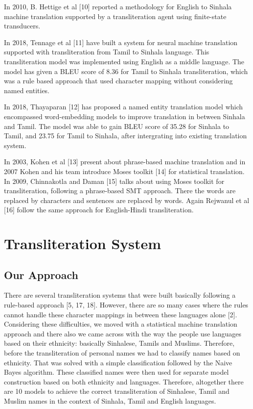 \documentclass[10pt, a4paper, conference, compsocconf]{IEEEtran}
\begin{document}
In 2010, B. Hettige et al [10] reported a methodology for English to Sinhala machine translation supported by a transliteration agent using finite-state transducers. 

In 2018, Tennage et al [11] have built a system for neural machine translation supported with transliteration from Tamil to Sinhala language. This transliteration model was implemented using English as a middle language. The model has given a BLEU score of 8.36 for Tamil to Sinhala transliteration, which was a rule based approach that used character mapping without considering named entities.

In 2018, Thayaparan [12] has proposed a named entity translation model which encompassed word-embedding models to improve translation in between Sinhala and Tamil. The model was able to gain BLEU score of 35.28 for Sinhala to Tamil, and 23.75 for Tamil to Sinhala, after intergrating into existing translation system.

In 2003, Kohen et al [13] present about phrase-based machine translation and in 2007 Kohen and his team introduce Moses toolkit [14] for statistical translation. In 2009, Chinnakotla and Daman [15] talks about using Moses toolkit for transliteration, following a phrase-based SMT approach. There the words are replaced by characters and sentences are replaced by words. Again Rejwanul et al [16] follow the same approach for English-Hindi transliteration.

\section{Transliteration System}

\subsection{Our Approach}

There are several transliteration systems that were built basically following a rule-based approach [5, 17, 18]. However, there are so many cases where the rules cannot handle these character mappings in between these languages alone [2]. Considering these difficulties, we moved with a statistical machine translation approach and there also we came across with the way the people use languages based on their ethnicity: basically Sinhalese, Tamils and Muslims.  Therefore, before the transliteration of personal names we had to classify names based on ethnicity. That was solved with a simple classification followed by the Naive Bayes algorithm. These classified names were then used for separate model construction based on both ethnicity and languages. Therefore, altogether there are 10 models to achieve the correct transliteration of Sinhalese, Tamil and Muslim names in the context of Sinhala, Tamil and English languages.
	 	 	
\end{document}
